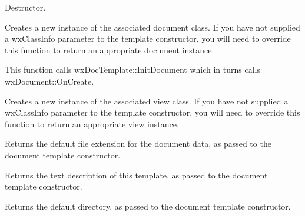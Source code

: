 \label{wxdoctemplatedtor}


Destructor.

\label{wxdoctemplatecreatedocument}


Creates a new instance of the associated document class. If you have not supplied
a wxClassInfo parameter to the template constructor, you will need to override this
function to return an appropriate document instance.

This function calls wxDocTemplate::InitDocument which in turns
calls wxDocument::OnCreate.

\label{wxdoctemplatecreateview}


Creates a new instance of the associated view class. If you have not supplied
a wxClassInfo parameter to the template constructor, you will need to override this
function to return an appropriate view instance.

\label{wxdoctemplategetdefaultextension}


Returns the default file extension for the document data, as passed to the document template constructor.

\label{wxdoctemplategetdescription}


Returns the text description of this template, as passed to the document template constructor.

\label{wxdoctemplategetdirectory}


Returns the default directory, as passed to the document template constructor.

\label{wxdoctemplategetdocumentmanager}


